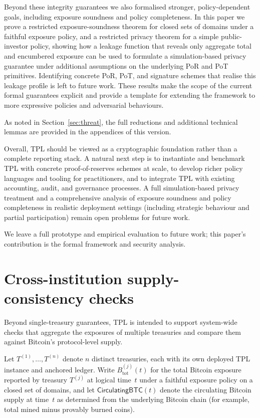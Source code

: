 \documentclass[11pt]{article}
\begin{document}
Beyond these integrity guarantees we also formalised stronger, policy-dependent goals,
including exposure soundness and policy completeness.
In this paper we prove a restricted exposure-soundness theorem for closed sets of domains under a
faithful exposure policy, and a restricted privacy theorem for a simple public-investor policy,
showing how a leakage function that reveals only aggregate total and encumbered exposure can be
used to formulate a simulation-based privacy guarantee under additional assumptions on the
underlying PoR and PoT primitives.
Identifying concrete PoR, PoT, and signature schemes that realise this leakage profile is left to future work.
These results make the scope of the current formal guarantees explicit and provide a template for
extending the framework to more expressive policies and adversarial behaviours.

As noted in Section~\ref{sec:threat}, the full reductions and additional technical lemmas are provided in the appendices of this version.

Overall, TPL should be viewed as a cryptographic foundation rather than a complete reporting stack.
A natural next step is to instantiate and benchmark TPL with concrete proof-of-reserves schemes at
scale, to develop richer policy languages and tooling for practitioners, and to integrate TPL with
existing accounting, audit, and governance processes.
A full simulation-based privacy treatment and a comprehensive analysis of exposure soundness and
policy completeness in realistic deployment settings (including strategic behaviour and partial
participation) remain open problems for future work.

We leave a full prototype and empirical evaluation to future work; this paper's contribution is the formal framework and security analysis.

\appendix

\section{Cross-institution supply-consistency checks}
\label{sec:supply-consistency}

Beyond single-treasury guarantees, TPL is intended to support system-wide checks that aggregate the exposures of multiple
treasuries and compare them against Bitcoin's protocol-level supply.

Let $T^{(1)},\dots,T^{(n)}$ denote $n$ distinct treasuries, each with its own deployed TPL instance and anchored ledger.
Write $B_{\mathrm{tot}}^{(j)}(t)$ for the total Bitcoin exposure reported by treasury $T^{(j)}$ at logical time~$t$ under a
faithful exposure policy on a closed set of domains, and let $\mathsf{CirculatingBTC}(t)$ denote the circulating Bitcoin
supply at time~$t$ as determined from the underlying Bitcoin chain (for example, total mined minus provably burned coins).
\end{document}
